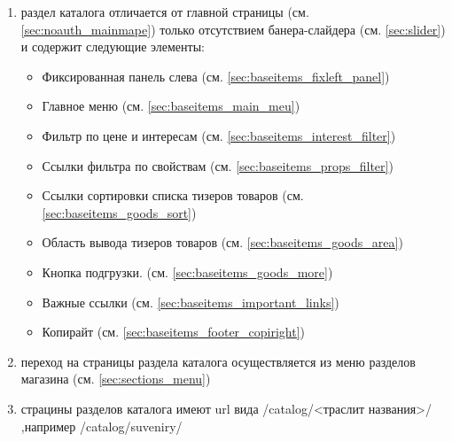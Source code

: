         \begin{enumerate}
            \item 
                раздел каталога отличается от главной страницы (см. 
                    \ref{sec:noauth_mainmape}) 
                только отсутствием банера-слайдера (см. \ref{sec:slider}) и 
                    содержит следующие элементы:
                \begin{itemize}
                    \item Фиксированная панель слева (см. 
                        \ref{sec:baseitems_fixleft_panel})
                    \item Главное меню (см. \ref{sec:baseitems_main_meu})
                    \item Фильтр по цене и интересам (см. 
                        \ref{sec:baseitems_interest_filter})
                    \item Ссылки фильтра по свойствам (см. 
                        \ref{sec:baseitems_props_filter})
                    \item Ссылки сортировки списка тизеров товаров (см. 
                        \ref{sec:baseitems_goods_sort})
                    \item Область вывода тизеров товаров (см. 
                        \ref{sec:baseitems_goods_area})
                    \item Кнопка подгрузки.  (см. 
                        \ref{sec:baseitems_goods_more})
                    \item Важные ссылки (см. 
                        \ref{sec:baseitems_important_links})
                    \item Копирайт (см. \ref{sec:baseitems_footer_copiright})
                \end{itemize}
            \item переход на страницы раздела каталога осуществляется из 
                меню разделов магазина (см. \ref{sec:sections_menu})
            \item страцины разделов каталога имеют url вида 
                /catalog/<траслит названия>/ ,например /catalog/suveniry/
        \end{enumerate}

